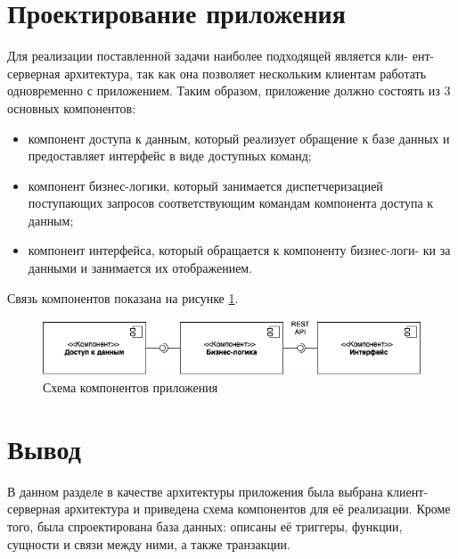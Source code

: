 \section{Проектирование приложения}
Для реализации поставленной задачи наиболее подходящей является кли- ент-серверная архитектура, так как она позволяет нескольким клиентам работать одновременно с приложением. Таким образом, приложение должно состоять из 3 основных компонентов:
\begin{itemize}
    \item компонент доступа к данным, который реализует обращение к базе данных и предоставляет интерфейс в виде доступных команд;
    \item компонент бизнес-логики, который занимается диспетчеризацией поступающих запросов соответствующим командам компонента доступа к данным;
    \item компонент интерфейса, который обращается к компоненту бизнес-логи- ки за данными и занимается их отображением.
\end{itemize}
Связь компонентов показана на рисунке \ref{fig:comps}.
\begin{figure}[H]
	\centering
	\includegraphics[width = \linewidth]{img/components.jpg}
	\caption{Схема компонентов приложения}
	\label{fig:comps}
\end{figure}

\section*{Вывод}

В данном разделе в качестве архитектуры приложения была выбрана клиент-серверная архитектура и приведена схема компонентов для её реализации. Кроме того, была спроектирована база данных: описаны её триггеры, функции, сущности и связи между ними, а также транзакции.
